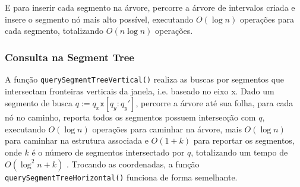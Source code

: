 \documentclass{article}
\theoremstyle{definition}
\begin{document}
E para inserir cada segmento na árvore, percorre a árvore de intervalos
criada e insere o segmento nó mais alto possível, executando $O(\log n)$ operações 
para cada segmento, totalizando $O(n\log n)$ operações\cite{bergBook}.


\subsubsection*{Consulta na Segment Tree}

A função \texttt{querySegmentTreeVertical()}
realiza as buscas por segmentos que intersectam fronteiras verticais
da janela, i.e. baseado no eixo x. Dado um segmento de busca $q := q_x \texttt{x} [q_y:q_y']$, 
percorre a árvore até sua folha, para cada nó no caminho, reporta todos
os segmentos possuem intersecção com $q$, executando $O(\log n)$ operações
para caminhar na árvore, mais $O(\log n)$ para caminhar na estrutura associada
e $O(1 + k)$ para reportar os segmentos, onde $k$ é o número de segmentos 
intersectado por $q$, totalizando um tempo de $O(\log^2n + k)$ \cite{bergBook}. 
Trocando as coordenadas, a função \texttt{querySegmentTreeHorizontal()}
funciona de forma semelhante.


\newpage


\end{document}
